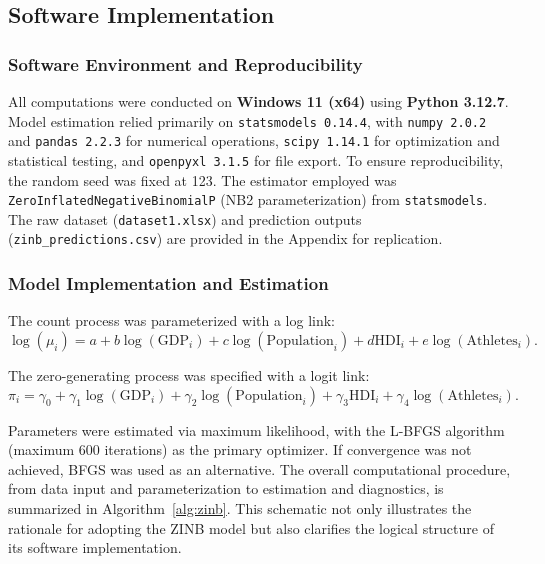 \documentclass[11pt,twoside]{article}
\numberwithin{Theorem}{section}
\numberwithin{Definition}{section}
\numberwithin{Lemma}{section}
\numberwithin{Algorithm}{section}
\numberwithin{equation}{section}
\begin{document}
\subsection{Software Implementation}
\label{subsec:software}

\subsubsection{Software Environment and Reproducibility}
All computations were conducted on \textbf{Windows 11 (x64)} using \textbf{Python 3.12.7}. Model estimation relied primarily on \texttt{statsmodels 0.14.4}, with \texttt{numpy 2.0.2} and \texttt{pandas 2.2.3} for numerical operations, \texttt{scipy 1.14.1} for optimization and statistical testing, and \texttt{openpyxl 3.1.5} for file export. To ensure reproducibility, the random seed was fixed at 123. The estimator employed was \texttt{ZeroInflatedNegativeBinomialP} (NB2 parameterization) from \texttt{statsmodels}. The raw dataset (\texttt{dataset1.xlsx}) and prediction outputs (\texttt{zinb\_predictions.csv}) are provided in the Appendix for replication.

\subsubsection{Model Implementation and Estimation}
The count process was parameterized with a log link:
\begin{equation}
\log(\mu_i) = a + b \log(\mathrm{GDP}_i) + c \log(\mathrm{Population}_i) + d \mathrm{HDI}_i + e \log(\mathrm{Athletes}_i).
\label{eq:count_link}
\end{equation}

The zero-generating process was specified with a logit link:
\begin{equation}
\pi_i = \gamma_0 + \gamma_1 \log(\mathrm{GDP}_i) + \gamma_2 \log(\mathrm{Population}_i) + \gamma_3 \mathrm{HDI}_i + \gamma_4 \log(\mathrm{Athletes}_i).
\label{eq:logit_link}
\end{equation}

Parameters were estimated via maximum likelihood, with the L-BFGS algorithm (maximum 600 iterations) as the primary optimizer. If convergence was not achieved, BFGS was used as an alternative. The overall computational procedure, from data input and parameterization to estimation and diagnostics, is summarized in Algorithm~\ref{alg:zinb}. This schematic not only illustrates the rationale for adopting the ZINB model but also clarifies the logical structure of its software implementation.
\end{document}
